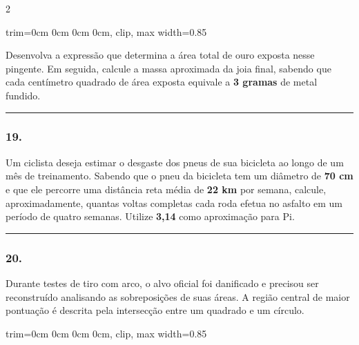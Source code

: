 \documentclass[twoside, 10pt, a4paper]{article}
\newlength{\espacoPreQuestao}\setlength{\espacoPreQuestao}{0.1cm}
\newlength{\espacoQuestao}\setlength{\espacoQuestao}{0.2cm}
\newcommand{\larguraTikz}{0.85\linewidth}
\begin{document}
\begin{multicols*}{2}
\begin{center}
\begin{adjustbox}{trim=0cm 0cm 0cm 0cm, clip, max width=\larguraTikz}
\end{adjustbox}
\end{center}
Desenvolva a expressão que determina a área total de ouro exposta nesse pingente. Em seguida, calcule a massa aproximada da joia final, sabendo que cada centímetro quadrado de área exposta equivale a \textbf{3 gramas} de metal fundido.
\par\vspace{\espacoQuestao}

\noindent\textcolor{CorLinha}{\rule{\linewidth}{0.5pt}} 
\par\vspace{\espacoPreQuestao}
\subsubsection*{19.} Um ciclista deseja estimar o desgaste dos pneus de sua bicicleta ao longo de um mês de treinamento. Sabendo que o pneu da bicicleta tem um diâmetro de \textbf{70 cm} e que ele percorre uma distância reta média de \textbf{22 km} por semana, calcule, aproximadamente, quantas voltas completas cada roda efetua no asfalto em um período de quatro semanas. Utilize \textbf{3,14} como aproximação para Pi.
\par\vspace{\espacoQuestao}

\noindent\textcolor{CorLinha}{\rule{\linewidth}{0.5pt}} 
\par\vspace{\espacoPreQuestao}
\subsubsection*{20.} Durante testes de tiro com arco, o alvo oficial foi danificado e precisou ser reconstruído analisando as sobreposições de suas áreas. A região central de maior pontuação é descrita pela intersecção entre um quadrado e um círculo.
\begin{center}
\begin{adjustbox}{trim=0cm 0cm 0cm 0cm, clip, max width=\larguraTikz}
\end{adjustbox}
\end{center}
\end{multicols*}
\end{document}
